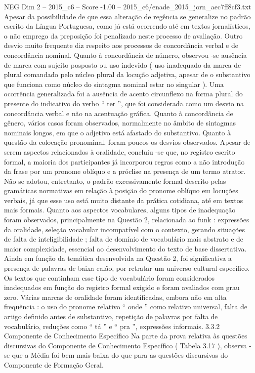\begin{textsample}{NEG Dim 2 – 2015\_c6 – Score -1.00 – 2015\_c6/enade\_2015\_jorn\_aec7ff8cf3.txt}
Apesar da possibilidade de que essa alteração de regência se generalize no padrão escrito da Língua Portuguesa, como já está ocorrendo até em textos jornalísticos, o não emprego da preposição foi penalizado neste processo de avaliação.
Outro desvio muito frequente diz respeito aos processos de concordância verbal e de concordância nominal.
Quanto à concordância de número, observou -se ausência de marca com sujeito posposto ou uso indevido ( uso inadequado da marca de plural comandado pelo núcleo plural da locução adjetiva, apesar de o substantivo que funciona como núcleo do sintagma nominal estar no singular ).
Uma ocorrência generalizada foi a ausência de acento circunflexo na forma plural do presente do indicativo do verbo “ ter ”, que foi considerada como um desvio na concordância verbal e não na acentuação gráfica.
Quanto à concordância de gênero, vários casos foram observados, normalmente no âmbito de sintagmas nominais longos, em que o adjetivo está afastado do substantivo.
Quanto à questão da colocação pronominal, foram poucos os desvios observados.
Apesar de serem aspectos relacionados à oralidade, concluiu -se que, no registro escrito formal, a maioria dos participantes já incorporou regras como a não introdução da frase por um pronome oblíquo e a próclise na presença de um termo atrator.
Não se adotou, entretanto, o padrão excessivamente formal descrito pelas gramáticas normativas em relação à posição do pronome oblíquo em locuções verbais, já que esse uso está muito distante da prática cotidiana, até em textos mais formais.
Quanto aos aspectos vocabulares, alguns tipos de inadequação foram observados, principalmente na Questão 2, relacionada ao funk : expressões da oralidade, seleção vocabular incompatível com o contexto, gerando situações de falta de inteligibilidade ; falta de domínio de vocabulário mais abstrato e de maior complexidade, essencial ao desenvolvimento do texto de base dissertativa.
Ainda em função da temática desenvolvida na Questão 2, foi significativa a presença de palavras de baixa calão, por retratar um universo cultural específico.
Os textos que continham esse tipo de vocabulário foram considerados inadequados em função do registro formal exigido e foram avaliados com grau zero.
Várias marcas de oralidade foram identificadas, embora não em alta frequência : o uso do pronome relativo “ onde ” como relativo universal, falta de artigo definido antes de substantivo, repetição de palavras por falta de vocabulário, reduções como “ tá ” e “ pra ”, expressões informais. 3.3.2 Componente de Conhecimento Específico Na parte da prova relativa às questões discursivas do Componente de Conhecimento Específico ( Tabela 3.17 ), observa -se que a Média foi bem mais baixa do que para as questões discursivas do Componente de Formação Geral.

\end{textsample}

